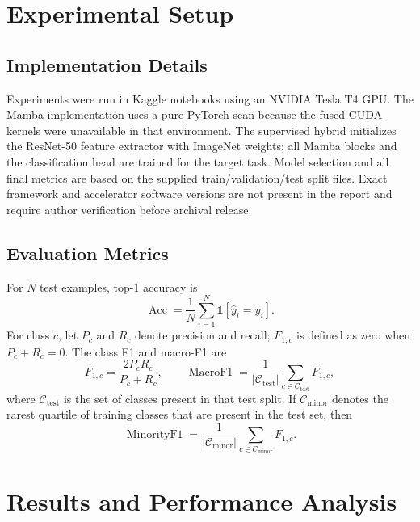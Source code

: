 \documentclass[conference]{IEEEtran}
\begin{document}
\section{Experimental Setup}
\subsection{Implementation Details}
Experiments were run in Kaggle notebooks using an NVIDIA Tesla T4 GPU. The Mamba implementation uses a pure-PyTorch scan because the fused CUDA kernels were unavailable in that environment. The supervised hybrid initializes the ResNet-50 feature extractor with ImageNet weights; all Mamba blocks and the classification head are trained for the target task. Model selection and all final metrics are based on the supplied train/validation/test split files. Exact framework and accelerator software versions are not present in the report and require author verification before archival release.

\subsection{Evaluation Metrics}
For $N$ test examples, top-1 accuracy is
\begin{equation}
    \operatorname{Acc}=\frac{1}{N}\sum_{i=1}^{N}\mathbb{1}[\hat{y}_i=y_i].
\end{equation}
For class $c$, let $P_c$ and $R_c$ denote precision and recall; $F_{1,c}$ is defined as zero when $P_c+R_c=0$. The class F1 and macro-F1 are
\begin{equation}
    F_{1,c}=\frac{2P_cR_c}{P_c+R_c},\qquad \operatorname{MacroF1}=\frac{1}{|\mathcal{C}_{\mathrm{test}}|}\sum_{c\in\mathcal{C}_{\mathrm{test}}}F_{1,c},
\end{equation}
where $\mathcal{C}_{\mathrm{test}}$ is the set of classes present in that test split. If $\mathcal{C}_{\mathrm{minor}}$ denotes the rarest quartile of training classes that are present in the test set, then
\begin{equation}
    \operatorname{MinorityF1}=\frac{1}{|\mathcal{C}_{\mathrm{minor}}|}\sum_{c\in\mathcal{C}_{\mathrm{minor}}}F_{1,c}.
\end{equation}

\section{Results and Performance Analysis}
\end{document}
